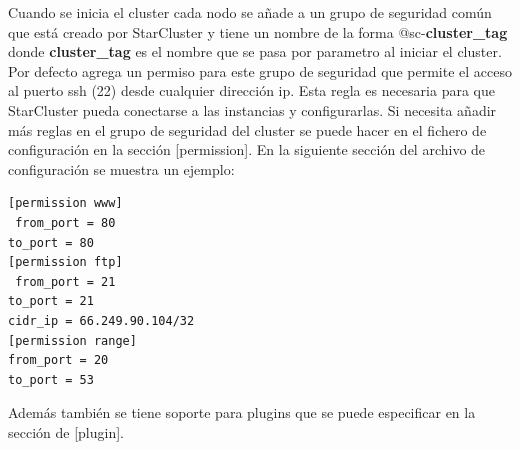 \documentclass{article}
\begin{document}
	Cuando se inicia el cluster cada nodo se añade a un grupo de seguridad común que está creado por StarCluster y tiene un nombre de la forma @sc-\textbf{cluster\_tag} donde \textbf{cluster\_tag} es el nombre que se pasa por parametro al iniciar el cluster. Por defecto agrega un permiso para este grupo de seguridad que permite el acceso al puerto ssh (22) desde cualquier dirección ip. Esta regla es necesaria para que StarCluster pueda conectarse a las instancias y configurarlas. Si necesita añadir más reglas en el grupo de seguridad del cluster se puede hacer en el fichero de configuración en la sección [permission].  En la siguiente sección del archivo de configuración se muestra un ejemplo:
\begin{lstlisting}
[permission www]
 from_port = 80
to_port = 80
[permission ftp]
 from_port = 21
to_port = 21
cidr_ip = 66.249.90.104/32
[permission range]
from_port = 20
to_port = 53
\end{lstlisting}

	Además también se tiene soporte para plugins\cite{SystemPlugin} que se puede especificar en la sección de [plugin].
\end{document}
